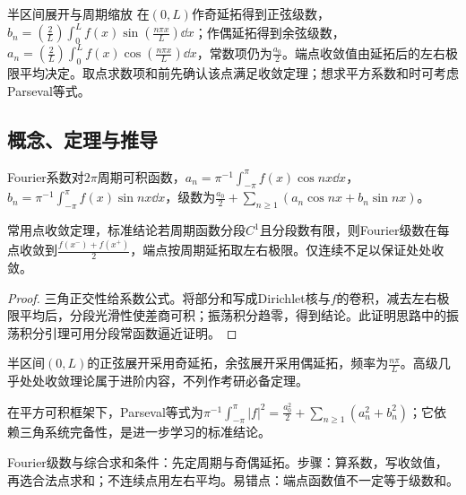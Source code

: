 \begin{method}{半区间展开与周期缩放}
在$(0,L)$作奇延拓得到正弦级数，$b_n=(\frac{2}{L})\int_0^Lf(x)\sin(\frac{n\pi x}{L})\dd x$；作偶延拓得到余弦级数，$a_n=(\frac{2}{L})\int_0^Lf(x)\cos(\frac{n\pi x}{L})\dd x$，常数项仍为$\frac{a_0}{2}$。端点收敛值由延拓后的左右极限平均决定。取点求数项和前先确认该点满足收敛定理；想求平方系数和时可考虑Parseval等式。
\end{method}

\subsection{概念、定理与推导}

\begin{definition}{Fourier系数}对$2\pi$周期可积函数，$a_n=\pi^{-1}\int_{-\pi}^{\pi}f(x)\cos nx\dd x$，$b_n=\pi^{-1}\int_{-\pi}^{\pi}f(x)\sin nx\dd x$，级数为$\frac{a_0}{2}+\sum_{n\ge1}(a_n\cos nx+b_n\sin nx)$。\end{definition}
\begin{theorem}{常用点收敛定理，标准结论}若周期函数分段$C^1$且分段数有限，则Fourier级数在每点收敛到$\frac{f(x^-)+f(x^+)}{2}$，端点按周期延拓取左右极限。仅连续不足以保证处处收敛。\end{theorem}
\begin{proof}三角正交性给系数公式。将部分和写成Dirichlet核与$f$的卷积，减去左右极限平均后，分段光滑性使差商可积；振荡积分趋零，得到结论。此证明思路中的振荡积分引理可用分段常函数逼近证明。\end{proof}
半区间$(0,L)$的正弦展开采用奇延拓，余弦展开采用偶延拓，频率为$\frac{n\pi}{L}$。高级几乎处处收敛理论属于进阶内容，不列作考研必备定理。
\begin{extension}在平方可积框架下，Parseval等式为$\pi^{-1}\int_{-\pi}^{\pi}|f|^2=\frac{a_0^2}{2}+\sum_{n\ge1}(a_n^2+b_n^2)$；它依赖三角系统完备性，是进一步学习的标准结论。\end{extension}

\begin{method}{Fourier级数与综合求和}条件：先定周期与奇偶延拓。步骤：算系数，写收敛值，再选合法点求和；不连续点用左右平均。易错点：端点函数值不一定等于级数和。\end{method}
